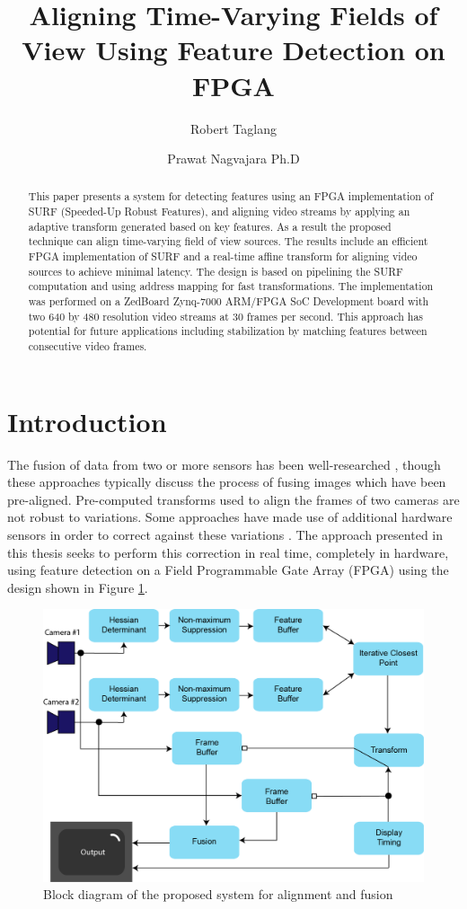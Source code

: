 \documentclass[sigconf]{acmart}
\title{Aligning Time-Varying Fields of View Using Feature Detection on FPGA}
\author{Robert Taglang}
\affiliation{%
	\institution{Drexel University}
	\city{Philadelphia} 
	\state{Pennsylvania} 
}
\author{Prawat Nagvajara Ph.D}
\affiliation{%
	\institution{Drexel University}
	\city{Philadelphia} 
	\state{Pennsylvania} 
}
\begin{document}
\begin{abstract}
	This paper presents a system for detecting features using an FPGA implementation of SURF (Speeded-Up Robust Features), and aligning video streams by applying an adaptive transform generated based on key features. As a result the proposed technique can align time-varying field of view sources. The results include an efficient FPGA implementation of SURF and a real-time affine transform for aligning video sources to achieve minimal latency. The design is based on pipelining the SURF computation and using address mapping for fast transformations. The implementation was performed on a ZedBoard Zynq-7000 ARM/FPGA SoC Development board with two 640 by 480 resolution video streams at 30 frames per second. This approach has potential for future applications including stabilization by matching features between consecutive video frames.
\end{abstract}

\maketitle

\section{Introduction}

The fusion of data from two or more sensors has been well-researched \cite{wang_multi-focus_2011} \cite{li_multi-sensor_1994}, though these approaches typically discuss the process of fusing images which have been pre-aligned. Pre-computed transforms used to align the frames of two cameras are not robust to variations. Some approaches have made use of additional hardware sensors in order to correct against these variations \cite{chappell_exploiting_2006}. The approach presented in this thesis seeks to perform this correction in real time, completely in hardware, using feature detection on a Field Programmable Gate Array (FPGA) using the design shown in Figure \ref{fig_block_diagram}.

\begin{figure}[h]
	\centering
	\includegraphics[width=\columnwidth]{figures/block/blockdiagram}
	\caption{Block diagram of the proposed system for alignment and fusion}
	\label{fig_block_diagram}
\end{figure}
\end{document}
